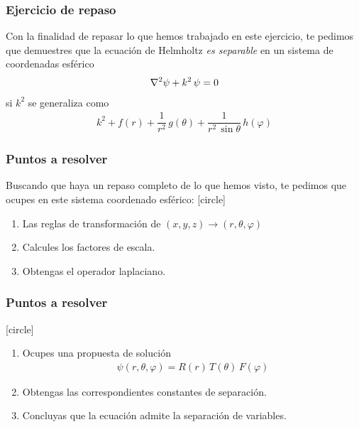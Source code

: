 \documentclass[12pt]{beamer}
\begin{document}
\begin{frame}
\frametitle{Ejercicio de repaso}
Con la finalidad de repasar lo que hemos trabajado en este ejercicio, te pedimos que demuestres que la ecuación de Helmholtz \emph{es separable} en un sistema de coordenadas esférico
\begin{align*}
\laplacian{\psi} + k^{2} \, \psi = 0
\end{align*}
si $k^{2}$ se generaliza como
\begin{align*}
k^{2} + f(r) + \dfrac{1}{r^{2}} \, g(\theta) + \dfrac{1}{r^{2} \, \sin \theta} \, h(\varphi)
\end{align*}
\end{frame}
\begin{frame}
\frametitle{Puntos a resolver}
Buscando que haya un repaso completo de lo que hemos visto, te pedimos que ocupes en este sistema coordenado esférico:
[circle]
\begin{enumerate}[<+->]
\item Las reglas de transformación de $(x, y, z) \to (r, \theta, \varphi)$
\item Calcules los factores de escala.
\item Obtengas el operador laplaciano.
\seti
\end{enumerate}
\end{frame}
\begin{frame}
\frametitle{Puntos a resolver}
[circle]
\begin{enumerate}[<+->]
\conti    
\item Ocupes una propuesta de solución
\begin{align*}
\psi(r, \theta, \varphi) = R(r)\, T(\theta) \, F(\varphi)
\end{align*}
\item Obtengas las correspondientes constantes de separación.
\item Concluyas que la ecuación admite la separación de variables.
\end{enumerate}
\end{frame}
\end{document}
